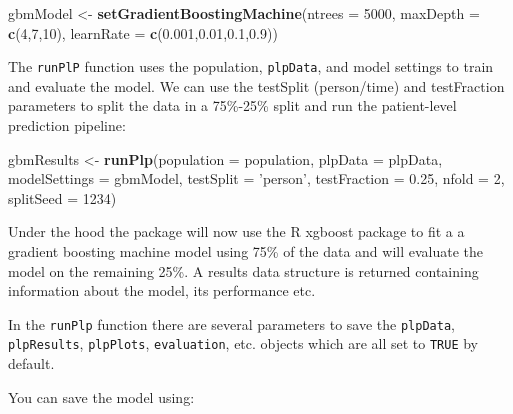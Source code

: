 \documentclass[11pt]{book}
\newenvironment{Shaded}{\begin{snugshade}}{\end{snugshade}}
\newcommand{\KeywordTok}[1]{\textcolor[rgb]{0.13,0.29,0.53}{\textbf{#1}}}
\newcommand{\DataTypeTok}[1]{\textcolor[rgb]{0.13,0.29,0.53}{#1}}
\newcommand{\DecValTok}[1]{\textcolor[rgb]{0.00,0.00,0.81}{#1}}
\newcommand{\FloatTok}[1]{\textcolor[rgb]{0.00,0.00,0.81}{#1}}
\newcommand{\StringTok}[1]{\textcolor[rgb]{0.31,0.60,0.02}{#1}}
\newcommand{\OperatorTok}[1]{\textcolor[rgb]{0.81,0.36,0.00}{\textbf{#1}}}
\newcommand{\NormalTok}[1]{#1}
\begin{document}
\begin{Shaded}
\begin{Highlighting}[]
\NormalTok{gbmModel <-}\StringTok{ }\KeywordTok{setGradientBoostingMachine}\NormalTok{(}\DataTypeTok{ntrees =} \DecValTok{5000}\NormalTok{, }
                                       \DataTypeTok{maxDepth =} \KeywordTok{c}\NormalTok{(}\DecValTok{4}\NormalTok{,}\DecValTok{7}\NormalTok{,}\DecValTok{10}\NormalTok{), }
                                       \DataTypeTok{learnRate =} \KeywordTok{c}\NormalTok{(}\FloatTok{0.001}\NormalTok{,}\FloatTok{0.01}\NormalTok{,}\FloatTok{0.1}\NormalTok{,}\FloatTok{0.9}\NormalTok{))}
\end{Highlighting}
\end{Shaded}

The \texttt{runPlP} function uses the population, \texttt{plpData}, and
model settings to train and evaluate the model. We can use the testSplit
(person/time) and testFraction parameters to split the data in a
75\%-25\% split and run the patient-level prediction pipeline:

\begin{Shaded}
\begin{Highlighting}[]
\NormalTok{gbmResults <-}\StringTok{ }\KeywordTok{runPlp}\NormalTok{(}\DataTypeTok{population =}\NormalTok{ population, }
                     \DataTypeTok{plpData =}\NormalTok{ plpData, }
                     \DataTypeTok{modelSettings =}\NormalTok{ gbmModel, }
                     \DataTypeTok{testSplit =} \StringTok{'person'}\NormalTok{,}
                     \DataTypeTok{testFraction =} \FloatTok{0.25}\NormalTok{, }
                     \DataTypeTok{nfold =} \DecValTok{2}\NormalTok{, }
                     \DataTypeTok{splitSeed =} \DecValTok{1234}\NormalTok{)}
\end{Highlighting}
\end{Shaded}

Under the hood the package will now use the R xgboost package to fit a a
gradient boosting machine model using 75\% of the data and will evaluate
the model on the remaining 25\%. A results data structure is returned
containing information about the model, its performance etc.

In the \texttt{runPlp} function there are several parameters to save the
\texttt{plpData}, \texttt{plpResults}, \texttt{plpPlots},
\texttt{evaluation}, etc. objects which are all set to \texttt{TRUE} by
default.

You can save the model using:

\begin{Shaded}
\end{Shaded}
\end{document}
